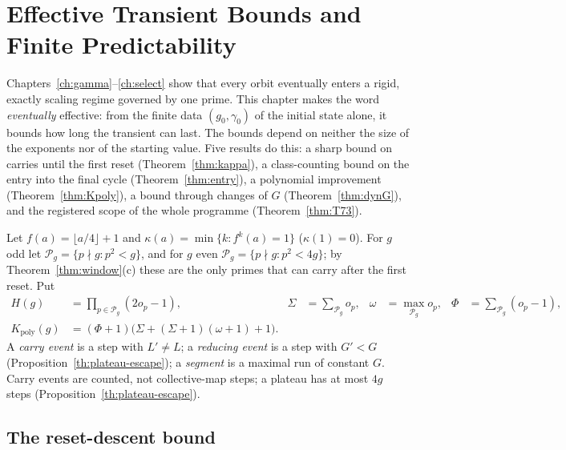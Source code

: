 \chapter{Effective Transient Bounds and Finite Predictability}\label{ch:bounds}

Chapters~\ref{ch:gamma}--\ref{ch:select} show that every orbit eventually enters a rigid, exactly scaling regime governed by one prime. This chapter makes the word \emph{eventually} effective: from the finite data \((g_0,\gamma_0)\) of the initial state alone, it bounds how long the transient can last. The bounds depend on neither the size of the exponents nor of the starting value. Five results do this: a sharp bound on carries until the first reset (Theorem~\ref{thm:kappa}), a class-counting bound on the entry into the final cycle (Theorem~\ref{thm:entry}), a polynomial improvement (Theorem~\ref{thm:Kpoly}), a bound through changes of \(G\) (Theorem~\ref{thm:dynG}), and the registered scope of the whole programme (Theorem~\ref{thm:T73}).

\begin{definition}\label{def:transient}
Let \(f(a)=\lfloor a/4\rfloor+1\) and \(\kappa(a)=\min\{k:f^k(a)=1\}\) (\(\kappa(1)=0\)). For \(g\) odd let \(\mathcal P_g=\{p\nmid g:p^2<g\}\), and for \(g\) even \(\mathcal P_g=\{p\nmid g:p^2<4g\}\); by Theorem~\ref{thm:window}(c) these are the only primes that can carry after the first reset. Put
\begin{align*}
H(g)&=\prod_{p\in\mathcal P_g}(2o_p-1), & \Sigma&=\sum_{\mathcal P_g}o_p, & \omega&=\max_{\mathcal P_g}o_p, & \Phi&=\sum_{\mathcal P_g}(o_p-1),\\
K_{\mathrm{poly}}(g)&=(\Phi+1)\big(\Sigma+(\Sigma+1)(\omega+1)+1\big).
\end{align*}
A \emph{carry event} is a step with \(L'\ne L\); a \emph{reducing event} is a step with \(G'<G\) (Proposition~\ref{th:plateau-escape}); a \emph{segment} is a maximal run of constant \(G\). Carry events are counted, not collective-map steps; a plateau has at most \(4g\) steps (Proposition~\ref{th:plateau-escape}).
\end{definition}

\section{The reset-descent bound}

